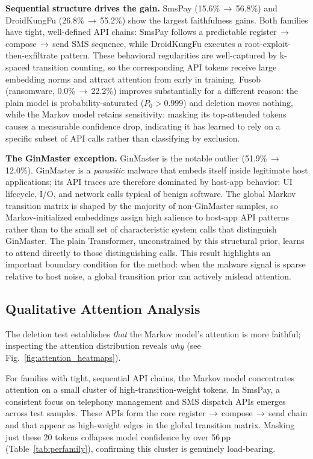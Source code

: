 \documentclass[12pt]{article}
\begin{document}
\textbf{Sequential structure drives the gain.}
SmsPay (15.6\%\,$\to$\,56.8\%) and DroidKungFu (26.8\%\,$\to$\,55.2\%)
show the largest faithfulness gains. Both families have tight,
well-defined API chains: SmsPay follows a predictable
register\,$\to$\,compose\,$\to$\,send SMS sequence, while DroidKungFu
executes a root-exploit-then-exfiltrate pattern.
These behavioral regularities are well-captured by k-spaced transition
counting, so the corresponding API tokens receive large embedding
norms and attract attention from early in training.
Fusob (ransomware, 0.0\%\,$\to$\,22.2\%) improves substantially for a
different reason: the plain model is probability-saturated
($P_0{>}0.999$) and deletion moves nothing, while the Markov model
retains sensitivity: masking its top-attended tokens causes a
measurable confidence drop, indicating it has learned to rely on
a specific subset of API calls rather than classifying by exclusion.

\textbf{The GinMaster exception.}
GinMaster is the notable outlier (51.9\%\,$\to$\,12.0\%).
GinMaster is a \textit{parasitic} malware that embeds itself inside
legitimate host applications; its API traces are therefore dominated
by host-app behavior: UI lifecycle, I/O, and network calls typical
of benign software. The global Markov transition matrix is shaped by
the majority of non-GinMaster samples, so Markov-initialized embeddings
assign high salience to host-app API patterns rather than to the
small set of characteristic system calls that distinguish GinMaster.
The plain Transformer, unconstrained by this structural prior, learns
to attend directly to those distinguishing calls.
This result highlights an important boundary condition for the method:
when the malware signal is sparse relative to host noise, a global
transition prior can actively mislead attention.

\subsection{Qualitative Attention Analysis}

The deletion test establishes \textit{that} the Markov model's
attention is more faithful; inspecting the attention distribution
reveals \textit{why} (see Fig.~\ref{fig:attention_heatmaps}).


For families with tight, sequential API chains, the Markov model
concentrates attention on a small cluster of high-transition-weight
tokens. In SmsPay, a consistent focus on telephony management and
SMS dispatch APIs emerges across test samples. These APIs form the
core register\,$\to$\,compose\,$\to$\,send chain and that appear
as high-weight edges in the global transition matrix. Masking just
these 20 tokens collapses model confidence by over 56\,pp
(Table~\ref{tab:perfamily}), confirming this cluster is genuinely
load-bearing.
\end{document}

